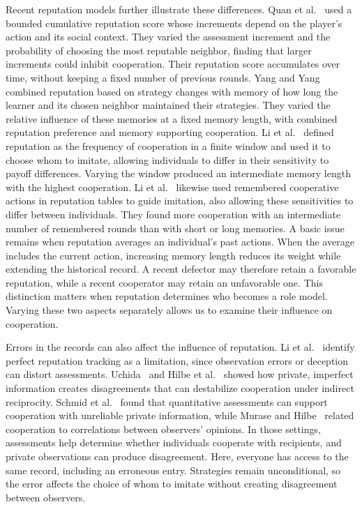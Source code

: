 \documentclass[physics,article,submit,moreauthors]{Definitions/mdpi}
\begin{document}
Recent reputation models further illustrate these differences. Quan et al.~\cite{quan2024} used a bounded cumulative reputation score whose increments depend on the player's action and its social context. They varied the assessment increment and the probability of choosing the most reputable neighbor, finding that larger increments could inhibit cooperation. Their reputation score accumulates over time, without keeping a fixed number of previous rounds. Yang and Yang~\cite{yang2025} combined reputation based on strategy changes with memory of how long the learner and its chosen neighbor maintained their strategies. They varied the relative influence of these memories at a fixed memory length, with combined reputation preference and memory supporting cooperation. Li et al.~\cite{li2025} defined reputation as the frequency of cooperation in a finite window and used it to choose whom to imitate, allowing individuals to differ in their sensitivity to payoff differences. Varying the window produced an intermediate memory length with the highest cooperation. Li et al.~\cite{li2026} likewise used remembered cooperative actions in reputation tables to guide imitation, also allowing these sensitivities to differ between individuals. They found more cooperation with an intermediate number of remembered rounds than with short or long memories. A basic issue remains when reputation averages an individual's past actions. When the average includes the current action, increasing memory length reduces its weight while extending the historical record. A recent defector may therefore retain a favorable reputation, while a recent cooperator may retain an unfavorable one. This distinction matters when reputation determines who becomes a role model. Varying these two aspects separately allows us to examine their influence on cooperation.

Errors in the records can also affect the influence of reputation. Li et al.~\cite{li2025} identify perfect reputation tracking as a limitation, since observation errors or deception can distort assessments. Uchida~\cite{uchida2010} and Hilbe et al.~\cite{hilbe2018} showed how private, imperfect information creates disagreements that can destabilize cooperation under indirect reciprocity. Schmid et al.~\cite{schmid2023} found that quantitative assessments can support cooperation with unreliable private information, while Murase and Hilbe~\cite{murase2024} related cooperation to correlations between observers' opinions. In those settings, assessments help determine whether individuals cooperate with recipients, and private observations can produce disagreement. Here, everyone has access to the same record, including an erroneous entry. Strategies remain unconditional, so the error affects the choice of whom to imitate without creating disagreement between observers.
\end{document}
